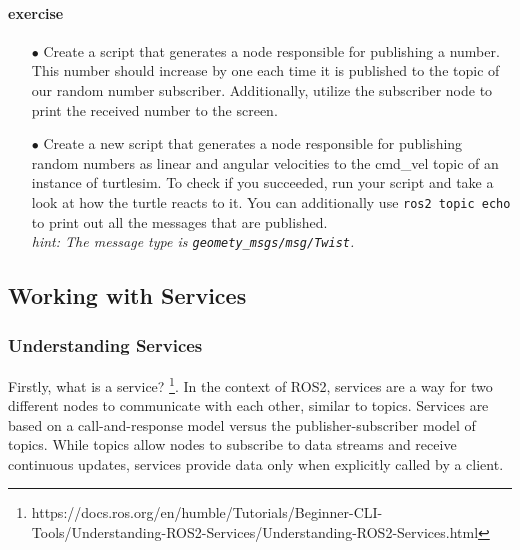 \documentclass{article}
\begin{document}
\paragraph{exercise}

\begin{enumerate}
\item[$\bullet$] Create a script that generates a node responsible for publishing a number. This number should increase by one each time it is published to the topic of our random number subscriber. Additionally, utilize the subscriber node to print the received number to the screen. 

\item[$\bullet$] Create a new script that generates a node responsible for publishing random numbers as linear and angular velocities to the cmd\_vel topic of an instance of turtlesim. To check if you succeeded, run your script and take a look at how the turtle reacts to it. You can additionally use \texttt{ros2 topic echo} to print out all the messages that are published.   \\
\textit{hint: The message type is \texttt{geomety\_msgs/msg/Twist}.}

\end{enumerate}

 

\subsection{Working with Services} 
\subsubsection{Understanding Services }

Firstly, what is a service? \footnote{\label{Services}https://docs.ros.org/en/humble/Tutorials/Beginner-CLI-Tools/Understanding-ROS2-Services/Understanding-ROS2-Services.html}. In the context of ROS2, services are a way for two different nodes to communicate with each other, similar to topics. Services are based on a call-and-response model versus the publisher-subscriber model of topics. While topics allow nodes to subscribe to data streams and receive continuous updates, services provide data only when explicitly called by a client.
\end{document}
